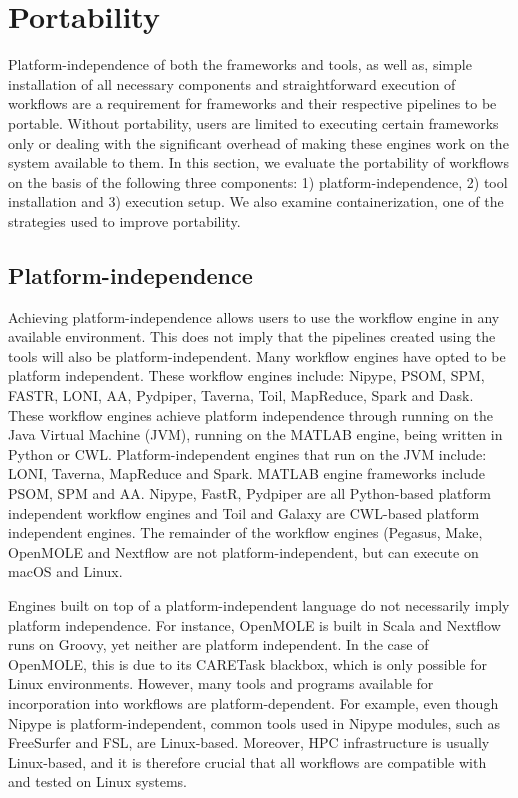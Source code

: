     \section{Portability}\label{portability} Platform-independence of both the
        frameworks and tools, as well as, simple installation of all necessary
        components and straightforward execution of workflows are a requirement
        for frameworks and their respective pipelines to be portable. Without
        portability, users are limited to executing certain frameworks only or
        dealing with the significant overhead of making these engines work on
        the system available to them. In this section, we evaluate the
        portability of workflows on the basis of the following three components:
        1) platform-independence, 2) tool installation and 3) execution setup.
        We also examine containerization, one of the strategies used to improve
        portability.

        \subsection{Platform-independence}
            Achieving platform-independence allows users to use the workflow
            engine in any available environment. This does not imply
            that the pipelines created using the tools will
            also be platform-independent. Many workflow engines have opted to be
            platform independent. These workflow engines include: Nipype, PSOM,
            SPM, FASTR, LONI, AA, Pydpiper, Taverna, Toil, MapReduce, Spark and
            Dask. These workflow engines achieve platform independence through
            running on the Java Virtual Machine (JVM), running on the MATLAB
            engine, being written in Python or CWL. Platform-independent engines
            that run on the JVM include: LONI, Taverna, MapReduce and Spark.
            MATLAB engine frameworks include PSOM, SPM and AA. Nipype, FastR,
            Pydpiper are all Python-based platform independent workflow engines
            and Toil and Galaxy are CWL-based platform independent engines. The
            remainder of the workflow engines (Pegasus, Make, OpenMOLE and
            Nextflow are not platform-independent, but can execute on macOS and
            Linux.

            Engines built on top of a platform-independent language do not
            necessarily imply platform independence. For instance, OpenMOLE is
            built in Scala and Nextflow runs on Groovy, yet neither are platform
            independent. In the case of OpenMOLE, this is due to its CARETask
            blackbox, which is only possible for Linux environments. However,
            many tools and programs available for incorporation into workflows
            are platform-dependent. For example, even though Nipype is
            platform-independent, common tools used in Nipype modules, such as
            FreeSurfer and FSL, are Linux-based. Moreover, HPC infrastructure is
            usually Linux-based, and it is therefore crucial that all workflows
            are compatible with and tested on Linux systems.
             
